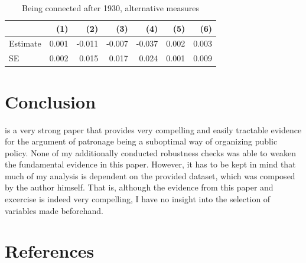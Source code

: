 \documentclass[a4paper]{article}\usepackage[]{graphicx}\usepackage[]{color}
\begin{document}
\begin{table}[!h]

\caption{\label{tab:combo_alt}Being connected after 1930, alternative measures}
\centering
\fontsize{7}{9}\selectfont
\begin{tabular}[t]{lrrrrrr}
\toprule
  & (1) & (2) & (3) & (4) & (5) & (6)\\
\midrule
Estimate & 0.001 & -0.011 & -0.007 & -0.037 & 0.002 & 0.003\\
SE & 0.002 & 0.015 & 0.017 & 0.024 & 0.001 & 0.009\\
\bottomrule
\end{tabular}
\end{table}



\section{Conclusion}
\cite{guoxu2018} is a very strong paper that provides very compelling and easily tractable evidence for the argument of patronage being a suboptimal way of organizing public policy. None of my additionally conducted robustness checks was able to weaken the fundamental evidence in this paper. However, it has to be kept in mind that much of my analysis is dependent on the provided dataset, which was composed by the author himself. That is, although the evidence from this paper and excercise is indeed very compelling, I have no insight into the selection of variables made beforehand. 

\section{References}
\printbibliography[heading=none]
\end{document}
